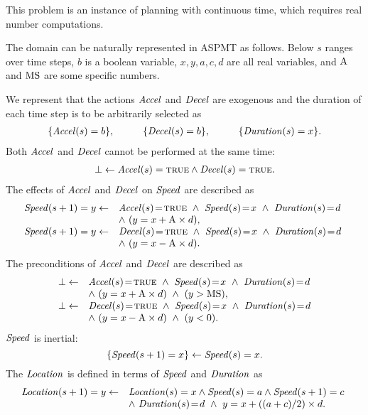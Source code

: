 \documentclass[runningheads]{llncs}
\def\ar{\leftarrow}
\def\ba{\begin{array}}
\def\ea{\end{array}}
\def\i#1{\hbox{\it #1\/}}
\def\ar{\leftarrow}
\def\mvis{\!=\!}
\def\true{\hbox{\sc true}}
\begin{document}
This problem is an instance of planning with continuous time, which
requires real number computations. 

The domain can be naturally represented in ASPMT as follows.
%
Below $s$ ranges over time steps, $b$ is a boolean variable,
$x,y,a,c,d$ are all real variables, and ${\rm A}$ and ${\rm MS}$
are some specific numbers.

We represent that the actions $\i{Accel}$ and $\i{Decel}$ are
exogenous and the duration of each time step is to be arbitrarily
selected as
\[
\ba{l}
\{\i{Accel}(s) = b\}, \hspace{1cm} 
\{\i{Decel}(s) = b\}, \hspace{1cm}
\{\i{Duration}(s) = x\}.\\
\ea
\]
Both $\i{Accel}$ and $\i{Decel}$ cannot be performed at the
same time: 
\[
\ba{l}%

\bot \leftarrow \i{Accel}(s) = \true \land \i{Decel}(s) = \true.\\
\ea
\]
The effects of $\i{Accel}$ and $\i{Decel}$ on $\i{Speed}$ are described as
\[
\ba{rl}
  \i{Speed}(s+1) = y \ar& \i{Accel}(s)\mvis\true\ \land\ 
                          \i{Speed}(s)\mvis x\ \land\ 
                          \i{Duration}(s)\mvis d  \\
   & \land\ (y = x+{\rm A}\times d),  \\
%
  \i{Speed}(s+1) = y \ar& \i{Decel}(s)\mvis\true\ \land\ 
                          \i{Speed}(s)\mvis x\ \land\ 
                          \i{Duration}(s)\mvis d\  \\
   & \land\ (y = x-{\rm A}\times d). 
\ea
\]
The preconditions of $\i{Accel}$ and $\i{Decel}$ are described as
\[
\ba{rl}
\bot \ar & \i{Accel}(s)\mvis\true\ \land\ 
           \i{Speed}(s)\mvis x\ \land\
           \i{Duration}(s)\mvis d \\
         & \land\ (y = x+{\rm A}\times d)\ \land\ (y > {\rm MS}), \\
\bot \ar & \i{Decel}(s)\mvis\true\ \land\ 
           \i{Speed}(s)\mvis x\ \land\
           \i{Duration}(s)\mvis d \\
         & \land\ (y = x-{\rm A}\times d)\ \land\ (y < 0).
\ea
\]
$\i{Speed}$ is inertial:
\[
  \{\i{Speed}(s+1) = x\} \ar \i{Speed}(s) = x.
\]
The $\i{Location}$ is defined in terms of $\i{Speed}$ and
$\i{Duration}$ as 
\[
\ba{rl}
\i{Location}(s+1) = y \ar & \i{Location}(s) = x \land 
     \i{Speed}(s)=a  \land 
     \i{Speed}(s+1) = c\  \\
     & \land\ \i{Duration}(s)\mvis d\ \land\ 
     y = x + ((a + c) / 2)\times d. 
\ea
\]
\end{document}
